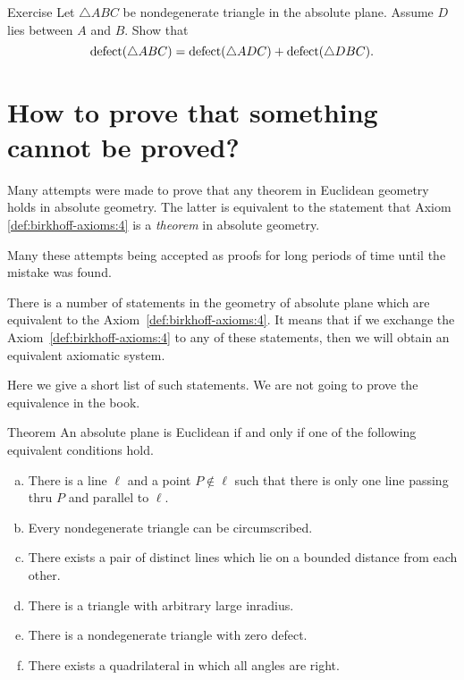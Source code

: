 \begin{thm}{Exercise}\label{ex:defect}
Let $\triangle ABC$ be nondegenerate triangle in the absolute plane.
Assume $D$ lies between $A$ and $B$.
Show that 
$$\mathop{\rm defect}\nolimits(\triangle ABC)=\mathop{\rm defect}\nolimits(\triangle ADC)+\mathop{\rm defect}\nolimits(\triangle DBC).$$

\end{thm}



\section*{How to prove that something\\ 
cannot be proved?}

Many attempts were made to prove that any theorem in Euclidean geometry holds in absolute geometry.
The latter is equivalent to the statement that Axiom \ref{def:birkhoff-axioms:4} is a {}\emph{theorem} in absolute geometry.

Many these attempts being accepted as proofs for long periods of time until the mistake was found.

There is a number of statements in the geometry of absolute plane which are equivalent to the Axiom~\ref{def:birkhoff-axioms:4}.
It means that if we exchange the Axiom~\ref{def:birkhoff-axioms:4}  to any of these statements, 
then we will obtain an equivalent axiomatic system.

Here we give a short list of such statements.
We are not going to prove the equivalence in the book.

\begin{thm}{Theorem}\label{thm:=IV}
An absolute plane is Euclidean if and only if one of the following equivalent conditions hold.
\begin{enumerate}[(a)]
\item\label{thm:=IV:main} 
There is a line $\ell$ 
and a point $P\notin\ell$ 
such that there is only one line passing thru $P$ 
and parallel to $\ell$.
\item 
Every nondegenerate triangle can be circumscribed.
\item
There exists a pair of distinct lines which lie on a bounded distance from each other.
\item
There is a triangle with arbitrary large inradius.
\item
There is a nondegenerate triangle with zero defect.
\item
There exists a quadrilateral in which all angles are right.
\end{enumerate}
\end{thm}

